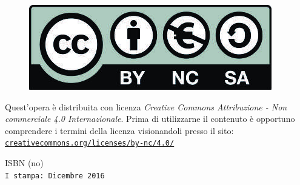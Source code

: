 \begin{figure}[h]
\centering
\includegraphics[width=0.3\linewidth]{images/by-nc-sa-eu.jpeg}
\label{fig:textfig-cc-licenza}
\end{figure}
\par Quest'opera è distribuita con licenza \emph{Creative Commons Attribuzione - Non commerciale 4.0 Internazionale}.
Prima di utilizzarne il contenuto è opportuno comprendere i termini della licenza visionandoli presso il sito:\\ \href{http://creativecommons.org/licenses/by-nc/4.0/}{\texttt{creativecommons.org/licenses/by-nc/4.0/}}
\vfill
\par ISBN (no) \\
\texttt{I stampa: Dicembre 2016}

